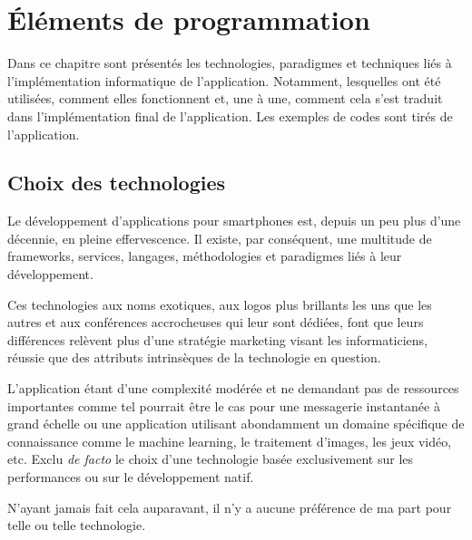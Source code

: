 
\chapter[Éléments de programmation]{Éléments de programmation}
Dans ce chapitre sont présentés les technologies, paradigmes
et techniques liés à l'implémentation informatique de
l'application. Notamment, lesquelles ont été utilisées,
comment elles fonctionnent et, une à une, comment cela
s’est traduit dans l'implémentation final de l'application.
Les exemples de codes sont tirés de l'application.

\section{Choix des technologies}
Le développement d'applications
pour smartphones est, depuis un peu plus d'une décennie, en pleine effervescence. Il existe, par
conséquent, une multitude de frameworks, services, langages, méthodologies et paradigmes liés à leur
développement.

Ces technologies aux noms exotiques, aux logos plus brillants les uns que les autres et aux
conférences accrocheuses qui leur sont dédiées, font que leurs différences relèvent plus
d'une stratégie marketing visant les informaticiens, réussie que des attributs
intrinsèques de la technologie en question.

L'application étant d'une complexité modérée et ne demandant pas de ressources importantes
comme tel pourrait être le cas pour une messagerie instantanée à grand échelle ou une application
utilisant abondamment un domaine spécifique de connaissance comme le machine learning, le traitement d'images, les jeux vidéo, etc.
Exclu \textit{de facto} le choix d'une technologie basée exclusivement sur les performances ou sur le développement natif.

N'ayant jamais fait cela auparavant, il n'y a aucune préférence de ma part pour telle ou telle technologie.

